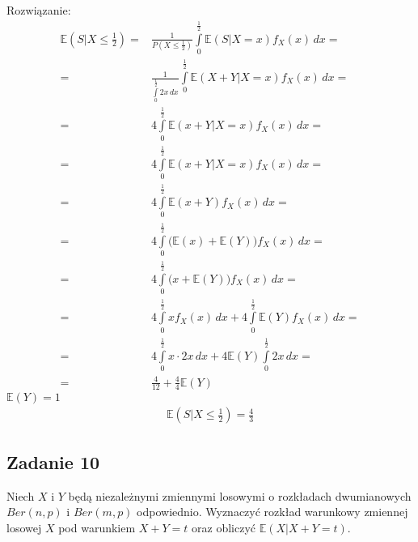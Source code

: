 Rozwiązanie:
\begin{align*}
\mathbb E \left(S|X\le\frac{1}{2}\right)=&
\frac{1}{P\left(X\le\frac{1}{2}\right)}\int\limits_{0}^{\frac{1}{2}}
\mathbb E \left(S|X=x\right)f_X(x)\,dx
=\\=&
\frac{1}{\int\limits_{0}^{\frac{1}{2}}2x\,dx}\int\limits_{0}^{\frac{1}{2}}
\mathbb E \left(X+Y|X=x\right)f_X(x)\,dx
=\\=&
4\int\limits_{0}^{\frac{1}{2}}
\mathbb E \left(x+Y|X=x\right)f_X(x)\,dx
=\\=&
4\int\limits_{0}^{\frac{1}{2}}
\mathbb E \left(x+Y|X=x\right)f_X(x)\,dx
=\\=&
4\int\limits_{0}^{\frac{1}{2}}
\mathbb E \left(x+Y\right)f_X(x)\,dx
=\\=&
4\int\limits_{0}^{\frac{1}{2}}
\bigl(\mathbb E \left(x\right) + \mathbb E \left(Y\right)\bigr)f_X(x)\,dx
=\\=&
4\int\limits_{0}^{\frac{1}{2}}
\bigl(x + \mathbb E \left(Y\right)\bigr)f_X(x)\,dx
=\\=&
4\int\limits_{0}^{\frac{1}{2}}
xf_X(x)\,dx + 
4\int\limits_{0}^{\frac{1}{2}}
\mathbb E \left(Y\right)f_X(x)\,dx
=\\=&
4\int\limits_{0}^{\frac{1}{2}}
x\cdot 2x\,dx + 
4\mathbb E \left(Y\right)\int\limits_{0}^{\frac{1}{2}}
2x\,dx
=\\=&
\frac{4}{12}+\frac{4}{4}\mathbb E \left(Y\right)
\end{align*}
$ \mathbb E \left(Y\right)=1 $
\begin{gather*}
\mathbb E \left(S|X\le\frac{1}{2}\right)=\frac{4}{3}
\end{gather*}


\subsection*{Zadanie 10}
Niech $ X $ i $ Y $ będą niezależnymi zmiennymi losowymi o rozkładach dwumianowych $ Ber(n,p) $ i $ Ber(m,p) $ odpowiednio. Wyznaczyć rozkład warunkowy zmiennej losowej $ X $ pod warunkiem $ X+Y=t $ oraz obliczyć $ \mathbb E \left(X|X+Y=t\right) $.

